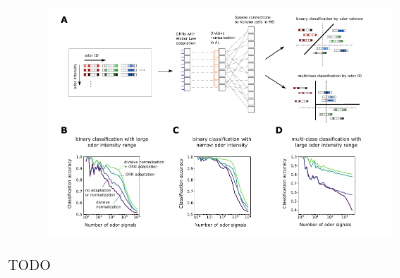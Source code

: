 \begin{figure}[!tb]
	\begin{subfigure}[t]{\linewidth}
		\includegraphics[width=\textwidth]{figures/6_downstream}
		\label{fig:downstream_a}	
	\end{subfigure}
	\begin{subfigure}[t]{0\linewidth}
		\label{fig:downstream_b}
	\end{subfigure}
	\begin{subfigure}[t]{0\linewidth}
		\label{fig:downstream_c}
	\end{subfigure}
	\begin{subfigure}[t]{0\linewidth}
		\label{fig:downstream_d}
	\end{subfigure}
	\caption{\footnotesize{TODO}}
	\label{fig:downstream}
\end{figure}


